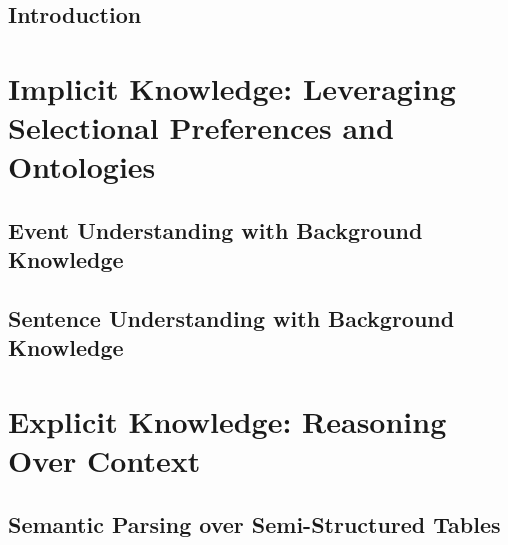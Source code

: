 \documentclass[12pt]{cmuthesis}
\begin{document}
% 



\tableofcontents
\listoffigures
\listoftables

\mainmatter


%
%
%
%
%


\chapter{Introduction}
\label{chapter:introduction}

\part{Implicit Knowledge: Leveraging Selectional Preferences and Ontologies}
\chapter{Event Understanding with Background Knowledge}
\label{chapter:nem}

\chapter{Sentence Understanding with Background Knowledge}
\label{chapter:ontolstm}

\part{Explicit Knowledge: Reasoning Over Context}
\chapter{Semantic Parsing over Semi-Structured Tables}
\label{chapter:neural_semantic_parsing}

\end{document}
